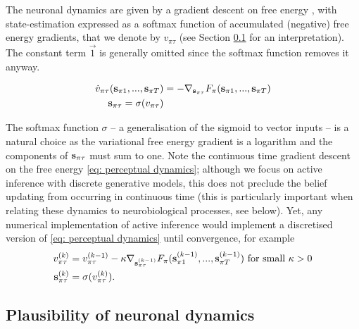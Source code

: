 \documentclass[review,12pt,authoryear]{elsarticle}
\begin{document}
The neuronal dynamics are given by a gradient descent on free energy \citep{fristonActiveInferenceProcess2017}, with state-estimation expressed as a softmax function of accumulated (negative) free energy gradients, that we denote by $v_{\pi \tau}$ (see Section \ref{sec: plausibility of neuronal dynamics} for an interpretation). The constant term $\vec{1}$ is generally omitted since the softmax function removes it anyway.

  	\begin{equation}
  	\label{eq: perceptual dynamics}
  	    \begin{split}
  	        \dot v_{\pi \tau} (\bold s_{\pi 1},...,\bold s_{\pi T})&=-\nabla_{\bold s_{\pi\tau}} F_\pi(\bold s_{\pi 1},...,\bold s_{\pi T}) \\
  	        \bold s_{\pi\tau} = \sigma (v_{\pi \tau})
  	    \end{split}
  	\end{equation}
  	
The softmax function $\sigma$ – a generalisation of the sigmoid to vector inputs – is a natural choice as the variational free energy gradient is a logarithm and the components of $\bold s_{\pi\tau}$ must sum to one. Note the continuous time gradient descent on the free energy \eqref{eq: perceptual dynamics}; although we focus on active inference with discrete generative models, this does not preclude the belief updating from occurring in continuous time (this is particularly important when relating these dynamics to neurobiological processes, see below). Yet, any numerical implementation of active inference would implement a discretised version of \eqref{eq: perceptual dynamics} until convergence, for example
  	\begin{equation*}
  	    \begin{split}
  	         v_{\pi \tau}^{(k)}&= v_{\pi \tau}^{(k-1)} -\kappa \nabla_{\bold s^{(k-1)}_{\pi\tau}} F_\pi(\bold s^{(k-1)}_{\pi 1},...,\bold s^{(k-1)}_{\pi T}) \text{ for small } \kappa >0 \\
  	        \bold s_{\pi\tau}^{(k)} &= \sigma (v_{\pi \tau}^{(k)}).
  	    \end{split}
  	\end{equation*}

\subsection{Plausibility of neuronal dynamics}
\label{sec: plausibility of neuronal dynamics}
\end{document}
